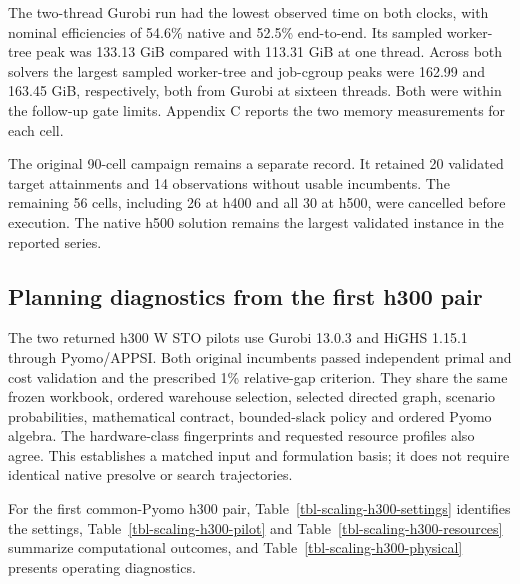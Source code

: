 \documentclass[
  english,
  11pt,
  a4paper,
  authoryear,
  preprint]{elsarticle}
\begin{document}
The two-thread Gurobi run had the lowest observed time on both clocks,
with nominal efficiencies of 54.6\% native and 52.5\% end-to-end. Its
sampled worker-tree peak was 133.13 GiB compared with 113.31 GiB at one
thread. Across both solvers the largest sampled worker-tree and
job-cgroup peaks were 162.99 and 163.45 GiB, respectively, both from
Gurobi at sixteen threads. Both were within the follow-up gate limits.
Appendix C reports the two memory measurements for each cell.

The original 90-cell campaign remains a separate record. It retained 20
validated target attainments and 14 observations without usable
incumbents. The remaining 56 cells, including 26 at h400 and all 30 at
h500, were cancelled before execution. The native h500 solution remains
the largest validated instance in the reported series.

\subsection{Planning diagnostics from the first h300
pair}\label{planning-diagnostics-from-the-first-h300-pair}

The two returned h300 W STO pilots use Gurobi 13.0.3 and HiGHS 1.15.1
through Pyomo/APPSI. Both original incumbents passed independent primal
and cost validation and the prescribed 1\% relative-gap criterion. They
share the same frozen workbook, ordered warehouse selection, selected
directed graph, scenario probabilities, mathematical contract,
bounded-slack policy and ordered Pyomo algebra. The hardware-class
fingerprints and requested resource profiles also agree. This
establishes a matched input and formulation basis; it does not require
identical native presolve or search trajectories.

For the first common-Pyomo h300 pair,
Table~\ref{tbl-scaling-h300-settings} identifies the settings,
Table~\ref{tbl-scaling-h300-pilot} and
Table~\ref{tbl-scaling-h300-resources} summarize computational outcomes,
and Table~\ref{tbl-scaling-h300-physical} presents operating
diagnostics.
\end{document}
